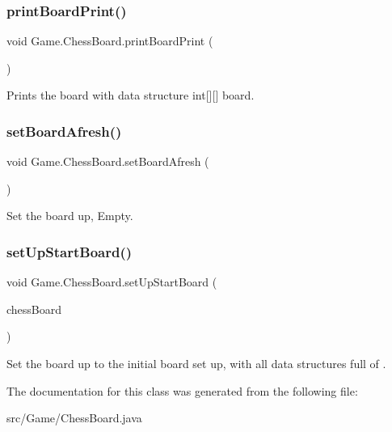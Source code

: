 \subsubsection{\texorpdfstring{print\+Board\+Print()}{printBoardPrint()}}
{\footnotesize\ttfamily void Game.\+Chess\+Board.\+print\+Board\+Print (\begin{DoxyParamCaption}{ }\end{DoxyParamCaption})\hspace{0.3cm}{\ttfamily [inline]}}

Prints the board with data structure int\mbox{[}\mbox{]}\mbox{[}\mbox{]} board. \mbox{\label{class_game_1_1_chess_board_a56eeb955a8ced4615f314e96e1d0fb0d}} 
\subsubsection{\texorpdfstring{set\+Board\+Afresh()}{setBoardAfresh()}}
{\footnotesize\ttfamily void Game.\+Chess\+Board.\+set\+Board\+Afresh (\begin{DoxyParamCaption}{ }\end{DoxyParamCaption})\hspace{0.3cm}{\ttfamily [inline]}}

Set the board up, Empty. \mbox{\label{class_game_1_1_chess_board_a9ec942366d90c6dca4c1da936e040474}} 
\subsubsection{\texorpdfstring{set\+Up\+Start\+Board()}{setUpStartBoard()}}
{\footnotesize\ttfamily void Game.\+Chess\+Board.\+set\+Up\+Start\+Board (\begin{DoxyParamCaption}\item[{\hyperlink{class_game_1_1_chess_board}{Chess\+Board}}]{chess\+Board }\end{DoxyParamCaption})\hspace{0.3cm}{\ttfamily [inline]}}

Set the board up to the initial board set up, with all data structures full of . 

The documentation for this class was generated from the following file\+:\begin{DoxyCompactItemize}
\item 
src/\+Game/Chess\+Board.\+java\end{DoxyCompactItemize}
